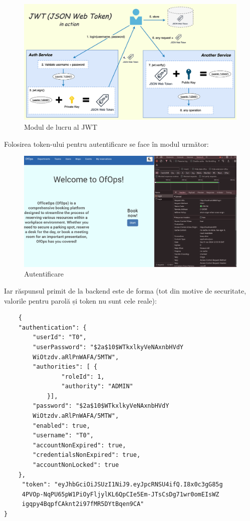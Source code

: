 \begin{figure}[!htb]
    \centering
    \includegraphics[width=0.9\linewidth]{images/jwt.png}
    \caption{Modul de lucru al JWT}
    \label{fig:jwt}
\end{figure}

\newpage
Folosirea token-ului pentru autentificare se face în modul următor:

\begin{figure}[!htb]
    \centering
    \includegraphics[width=0.9\linewidth]{images/autentificare.png}
    \caption{Autentificare}
    \label{fig:autentificare}
\end{figure}

Iar răspunsul primit de la backend este de forma (tot din motive de securitate, valorile pentru parolă și token nu sunt cele reale):

\begin{center}
\begin{minipage}{0.8\textwidth}
\captionsetup{type=listing}
   \begin{lstlisting}
    {
    "authentication": {
        "userId": "T0",
        "userPassword": "$2a$10$WTkxlkyVeNAxnbHVdY
        WiOtzdv.aRlPnWAFA/5MTW",
        "authorities": [ {
                "roleId": 1,
                "authority": "ADMIN"
            }],
        "password": "$2a$10$WTkxlkyVeNAxnbHVdY
        WiOtzdv.aRlPnWAFA/5MTW",
        "enabled": true,
        "username": "T0",
        "accountNonExpired": true,
        "credentialsNonExpired": true,
        "accountNonLocked": true
    },
     "token": "eyJhbGciOiJSUzI1NiJ9.eyJpcRNSU4ifQ.I8x0c3gG85g
     4PVOp-NqPU65pW1PiOyFljylKL6QpCIe5Em-JTsCsDg71wr0omEIsWZ
     igqpy4BqpfCAknt2i97fMR5DYtBqen9CA"
}
\end{lstlisting} 
\end{minipage}
\end{center}

